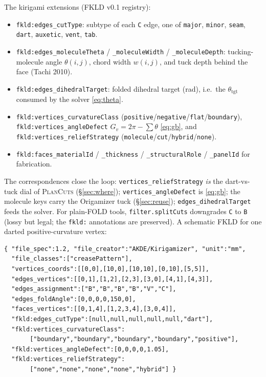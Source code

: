 \documentclass[11pt]{article}
\begin{document}
The kirigami extensions (FKLD v0.1 registry):
\begin{itemize}[leftmargin=1.4em,itemsep=1pt]
  \item \texttt{fkld:edges\_cutType}: subtype of each \texttt{C} edge, one of
  \texttt{major}, \texttt{minor}, \texttt{seam}, \texttt{dart},
  \texttt{auxetic}, \texttt{vent}, \texttt{tab}.
  \item \texttt{fkld:edges\_moleculeTheta} / \texttt{\_moleculeWidth} /
  \texttt{\_moleculeDepth}: tucking-molecule angle $\theta(i,j)$, chord width
  $w(i,j)$, and tuck depth behind the face (Tachi 2010).
  \item \texttt{fkld:edges\_dihedralTarget}: folded dihedral target (rad), i.e.\
  the $\theta_{\text{tgt}}$ consumed by the solver \eqref{eq:theta}.
  \item \texttt{fkld:vertices\_curvatureClass}
  (\texttt{positive}/\texttt{negative}/\texttt{flat}/\texttt{boundary}),
  \texttt{fkld:vertices\_angleDefect} $G_v=2\pi-\sum\theta$ \eqref{eq:gb}, and
  \texttt{fkld:vertices\_reliefStrategy}
  (\texttt{molecule}/\texttt{cut}/\texttt{hybrid}/\texttt{none}).
  \item \texttt{fkld:faces\_materialId} / \texttt{\_thickness} /
  \texttt{\_structuralRole} / \texttt{\_panelId} for fabrication.
\end{itemize}
The correspondences close the loop: \texttt{vertices\_reliefStrategy} \emph{is}
the dart-vs-tuck dial of \textsc{PlanCuts} (\S\ref{sec:where});
\texttt{vertices\_angleDefect} is \eqref{eq:gb}; the molecule keys carry the
Origamizer tuck (\S\ref{sec:reuse}); \texttt{edges\_dihedralTarget} feeds the
solver. For plain-FOLD tools, \texttt{filter.splitCuts} downgrades \texttt{C} to
\texttt{B} (lossy but legal; the \texttt{fkld:} annotations are preserved). A
schematic FKLD for one darted positive-curvature vertex:
\begin{verbatim}
{ "file_spec":1.2, "file_creator":"AKDE/Kirigamizer", "unit":"mm",
  "file_classes":["creasePattern"],
  "vertices_coords":[[0,0],[10,0],[10,10],[0,10],[5,5]],
  "edges_vertices":[[0,1],[1,2],[2,3],[3,0],[4,1],[4,3]],
  "edges_assignment":["B","B","B","B","V","C"],
  "edges_foldAngle":[0,0,0,0,150,0],
  "faces_vertices":[[0,1,4],[1,2,3,4],[3,0,4]],
  "fkld:edges_cutType":[null,null,null,null,null,"dart"],
  "fkld:vertices_curvatureClass":
       ["boundary","boundary","boundary","boundary","positive"],
  "fkld:vertices_angleDefect":[0,0,0,0,1.05],
  "fkld:vertices_reliefStrategy":
       ["none","none","none","none","hybrid"] }
\end{verbatim}
\end{document}

